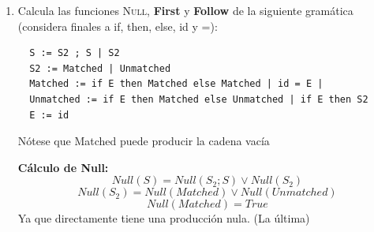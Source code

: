 \documentclass[12pt, letterpaper]{article}
\newcommand{\Null}{\textsc{Null}}
\newcommand{\Follow}{\textsc{Follow}}
\newcommand{\deriva}{\Rightarrow^{*}}
\newtheorem*{prop}{Proposición}
\newenvironment{solucion}{\par\medskip\noindent\textbf{\large Solución}\par\smallskip}{\par\bigskip}
\begin{document}
\begin{enumerate}
\begin{solucion}
    \begin{proof}
      En una gramática libre de contexto cada no terminal se reescribe sin importar
      lo que tenga alrededor. Los mismos pasos que llevan $\beta$ a $\varepsilon$
      pueden aplicarse dentro de $\gamma\,\beta\,\delta$ sin tocar $\gamma$ ni
      $\delta$.
    \end{proof}

    \begin{prop}
      Sea $X \to \alpha\, Y\, \beta$ una producción. Si $\Null(\beta)$, entonces
      $\Follow(X) \subseteq \Follow(Y)$.
    \end{prop}

    \begin{proof}
      Sea $t \in \Follow(X)$. Por definición existen $\gamma, \delta$ tales que
      \[
      S\,\$ \deriva \gamma\, X\, t\, \delta. \tag{1}
      \]
      Aplicando la producción $X \to \alpha\, Y\, \beta$:
      \[
      \gamma\, X\, t\, \delta \Rightarrow \gamma\, \alpha\, Y\, \beta\, t\, \delta. \tag{2}
      \]
      Como $\Null(\beta)$, por el lema (con contexto izquierdo $\gamma\alpha Y$ y
      contexto derecho $t\delta$):
      \[
      \gamma\, \alpha\, Y\, \beta\, t\, \delta \deriva \gamma\, \alpha\, Y\, t\, \delta. \tag{3}
      \]
      Encadenando (1), (2) y (3):
      \[
      S\,\$ \deriva (\gamma\alpha)\, Y\, t\, \delta.
      \]
      Así, $t$ aparece inmediatamente a la derecha de $Y$ en una forma sentencial,
      y por definición $t \in \Follow(Y)$. Como $t$ era un elemento arbitrario de
      $\Follow(X)$, se concluye $\Follow(X) \subseteq \Follow(Y)$.
    \end{proof}
  \end{solucion}

\item Calcula las funciones \textsc{Null}, \textbf{First} y \textbf{Follow} de la siguiente gramática (considera finales a if, then, else, id y =):
\begin{verbatim}
  S := S2 ; S | S2
  S2 := Matched | Unmatched
  Matched := if E then Matched else Matched | id = E |
  Unmatched := if E then Matched else Unmatched | if E then S2
  E := id
\end{verbatim}
Nótese que Matched puede producir la cadena vacía


\textbf{Cálculo de Null:}
\[
Null(S) = Null(S_2;S) \vee Null(S_2)
\]
\[
Null(S_2) = Null(Matched) \vee Null(Unmatched)
\]
\[
Null(Matched) = True
\] Ya que directamente tiene una producción nula. (La última)


\end{enumerate}
\end{document}
